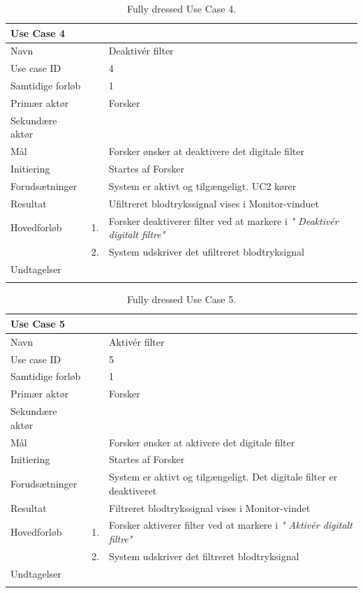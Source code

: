 \begin{longtabu} to  %
    {\large \textbf{Use Case 4}} && \\
    \toprule
    Navn &&    Deaktivér filter\\
    Use case ID &&    4\\
    Samtidige forløb &&   1\\
    Primær aktør &&    Forsker\\
    Sekundære aktør &&	 \\
    Mål &&    Forsker ønsker at deaktivere det digitale filter\\
    Initiering &&	Startes af Forsker\\
    Forudsætninger &&  System er aktivt og tilgængeligt. UC2 kører  \\
    Resultat &&		Ufiltreret blodtrykssignal vises i Monitor-vinduet                 \\ \midrule
    Hovedforløb &    1. &    Forsker deaktiverer filter ved at markere i \textit{" Deaktivér digitalt filtre"} \\[-1ex]   						 	
                &    2. &    System udskriver det ufiltreret blodtryksignal\newline\\ \midrule
                
    Undtagelser &     &      \\ \bottomrule
\caption{Fully dressed Use Case 4.}
\label{UC4}
\end{longtabu}


\begin{longtabu} to  %
    {\large \textbf{Use Case 5}} && \\
    \toprule
    Navn &&    Aktivér filter\\
    Use case ID &&    5\\
    Samtidige forløb &&   1\\
    Primær aktør &&    Forsker\\
    Sekundære aktør &&	 \\
    Mål &&    Forsker ønsker at aktivere det digitale filter\\
    Initiering &&	Startes af Forsker\\
    Forudsætninger &&  System er aktivt og tilgængeligt. Det digitale filter er deaktiveret  \\
    Resultat &&		Filtreret blodtrykssignal vises i Monitor-vindet                 \\ \midrule
    Hovedforløb &    1. &    Forsker aktiverer filter ved at markere i \textit{" Aktivér digitalt filtre"} \\[-1ex]   						 	
                &    2. &    System udskriver det filtreret blodtryksignal\newline\\ \midrule
                
    Undtagelser &     &      \\ \bottomrule
\caption{Fully dressed Use Case 5.}
\label{UC5}
\end{longtabu}
    
